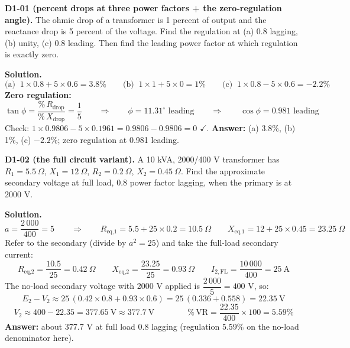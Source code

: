 \documentclass[11pt]{article}
\newcommand{\tagline}[1]{\textbf{\color{copper}#1}}
\begin{document}
\vspace{2pt}

\tagline{D1-01 (percent drops at three power factors + the zero-regulation angle).} The ohmic drop of a transformer is 1 percent of output and the reactance drop is 5 percent of the voltage. Find the regulation at (a) 0.8 lagging, (b) unity, (c) 0.8 leading. Then find the leading power factor at which regulation is exactly zero.

\textbf{Solution.}
\[
\text{(a)}\;\; 1 \times 0.8 + 5 \times 0.6 = 3.8\%
\qquad
\text{(b)}\;\; 1 \times 1 + 5 \times 0 = 1\%
\qquad
\text{(c)}\;\; 1 \times 0.8 - 5 \times 0.6 = -2.2\%
\]
\textbf{Zero regulation:}
\[
\tan\phi = \frac{\%\,R_{\text{drop}}}{\%\,X_{\text{drop}}} = \frac{1}{5}
\qquad\Longrightarrow\qquad
\phi = 11.31^\circ \text{ leading}
\qquad\Longrightarrow\qquad
\cos\phi = 0.981 \text{ leading}
\]
Check: $1 \times 0.9806 - 5 \times 0.1961 = 0.9806 - 0.9806 = 0$ $\checkmark$.
\textbf{Answer:} (a) 3.8\%, (b) 1\%, (c) $-2.2\%$; zero regulation at 0.981 leading.

\vspace{2pt}

\tagline{D1-02 (the full circuit variant).} A 10 kVA, 2000/400 V transformer has $R_1 = 5.5\ \Omega$, $X_1 = 12\ \Omega$, $R_2 = 0.2\ \Omega$, $X_2 = 0.45\ \Omega$. Find the approximate secondary voltage at full load, 0.8 power factor lagging, when the primary is at 2000 V.

\textbf{Solution.}
\[
a = \frac{2\,000}{400} = 5
\qquad\Longrightarrow\qquad
R_{\text{eq,1}} = 5.5 + 25 \times 0.2 = 10.5\ \Omega
\qquad
X_{\text{eq,1}} = 12 + 25 \times 0.45 = 23.25\ \Omega
\]
Refer to the secondary (divide by $a^{2} = 25$) and take the full-load secondary current:
\[
R_{\text{eq,2}} = \frac{10.5}{25} = 0.42\ \Omega
\qquad
X_{\text{eq,2}} = \frac{23.25}{25} = 0.93\ \Omega
\qquad
I_{2,\text{FL}} = \frac{10\,000}{400} = 25\ \text{A}
\]
The no-load secondary voltage with 2000 V applied is $\dfrac{2\,000}{5} = 400$ V, so:
\[
E_2 - V_2 \approx 25\,(0.42 \times 0.8 + 0.93 \times 0.6) = 25\,(0.336 + 0.558) = 22.35\ \text{V}
\]
\[
V_2 \approx 400 - 22.35 = 377.65\ \text{V} \approx 377.7\ \text{V}
\qquad\qquad
\%\,\text{VR} = \frac{22.35}{400} \times 100 = 5.59\%
\]
\textbf{Answer:} about 377.7 V at full load 0.8 lagging (regulation 5.59\% on the no-load denominator here).

\hrulefill
\end{document}
